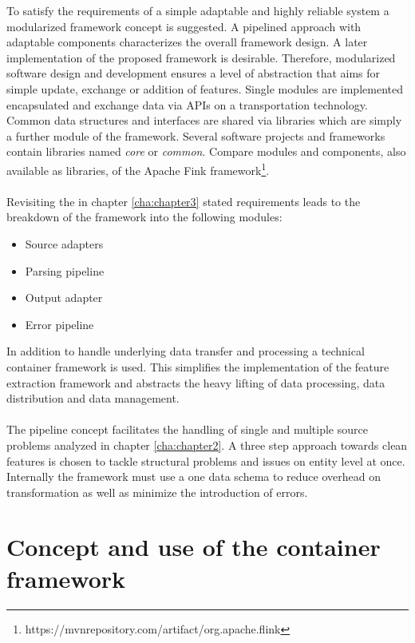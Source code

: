 To satisfy the requirements of a simple adaptable and highly reliable system a modularized framework concept is suggested. A pipelined approach with adaptable components characterizes the overall framework design. A later implementation of the proposed framework is desirable. Therefore, modularized software design and development ensures a level of abstraction that aims for simple update, exchange or addition of features. Single modules are implemented encapsulated and exchange data via APIs on a transportation technology. Common data structures and interfaces are shared via libraries which are simply a further module of the framework. Several software projects and frameworks contain libraries named \textit{core} or \textit{common}. Compare modules and components, also available as libraries, of the Apache Fink framework\footnote{https://mvnrepository.com/artifact/org.apache.flink}.
\\\\
Revisiting the in chapter \ref{cha:chapter3} stated requirements leads to the breakdown of the framework into the following modules:
\begin{itemize}
\item Source adapters
\item Parsing pipeline
\item Output adapter
\item Error pipeline
\end{itemize}
In addition to handle underlying data transfer and processing a technical container framework is used. This simplifies the implementation of the feature extraction framework and abstracts the heavy lifting of data processing, data distribution and data management.
\\\\
The pipeline concept facilitates the handling of single and multiple source problems analyzed in chapter \ref{cha:chapter2}. A three step approach towards clean features is chosen to tackle structural problems and issues on entity level at once. Internally the framework must use a one data schema to reduce overhead on transformation as well as minimize the introduction of errors.

\section{Concept and use of the container framework \label{sec:containerframework}}

